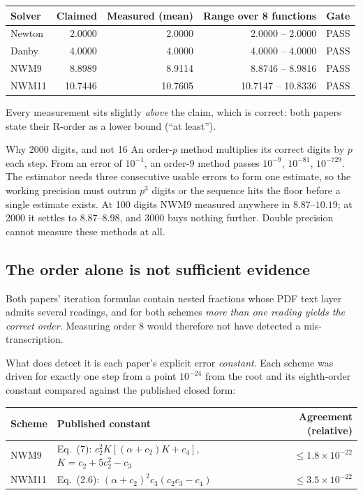 \documentclass[11pt,a4paper]{article}
\begin{document}
\begin{center}
\small
\begin{tabular}{@{}lrrrc@{}}
\toprule
\textbf{Solver} & \textbf{Claimed} & \textbf{Measured (mean)} & \textbf{Range over 8 functions} & \textbf{Gate} \\
\midrule
Newton  & 2.0000  & 2.0000  & 2.0000 -- 2.0000   & PASS \\
Danby   & 4.0000  & 4.0000  & 4.0000 -- 4.0000   & PASS \\
NWM9    & 8.8989  & 8.9114  & 8.8746 -- 8.9816   & PASS \\
NWM11   & 10.7446 & 10.7605 & 10.7147 -- 10.8336 & PASS \\
\bottomrule
\end{tabular}
\end{center}

Every measurement sits slightly \emph{above} the claim, which is correct:
both papers state their R-order as a lower bound (``at least'').

\begin{notetitled}{Why 2000 digits, and not 16}
An order-$p$ method multiplies its correct digits by $p$ each step. From
an error of $10^{-1}$, an order-9 method passes $10^{-9}$, $10^{-81}$,
$10^{-729}$. The estimator needs three consecutive usable errors to form
one estimate, so the working precision must outrun $p^3$ digits or the
sequence hits the floor before a single estimate exists. At 100 digits
NWM9 measured anywhere in $8.87$--$10.19$; at 2000 it settles to
$8.87$--$8.98$, and 3000 buys nothing further. Double precision cannot
measure these methods at all.
\end{notetitled}

\subsection{The order alone is not sufficient evidence}

Both papers' iteration formulas contain nested fractions whose PDF text
layer admits several readings, and for both schemes \emph{more than one
reading yields the correct order}. Measuring order 8 would therefore not
have detected a mis-transcription.

What does detect it is each paper's explicit error \emph{constant}. Each
scheme was driven for exactly one step from a point $10^{-24}$ from the
root and its eighth-order constant compared against the published closed
form:

\begin{center}
\small
\begin{tabular}{@{}llr@{}}
\toprule
\textbf{Scheme} & \textbf{Published constant} & \textbf{Agreement (relative)} \\
\midrule
NWM9  & Eq.~(7): $c_2^2 K[(\alpha+c_2)K + c_4]$, $K = c_2+5c_2^2-c_3$ & $\leq 1.8\times10^{-22}$ \\
NWM11 & Eq.~(2.6): $(\alpha+c_2)^2 c_3 (c_2c_3 - c_4)$                & $\leq 3.5\times10^{-22}$ \\
\bottomrule
\end{tabular}
\end{center}
\end{document}

